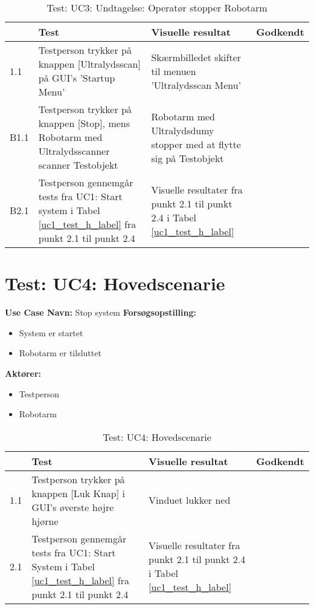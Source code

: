 \begin{table}[htb]
\begin{tabularx}{\textwidth}{|p{0.7cm}|X|X|p{2cm}|}
\hline
\textbf{} & \textbf{Test} & \textbf{Visuelle resultat} &\textbf{Godkendt} \\ \hline
1.1 & Testperson trykker på knappen [Ultralydsscan] på GUI's 'Startup Menu' & Skærmbilledet skifter til menuen 'Ultralydsscan Menu' & \\ \hline
B1.1 & Testperson trykker på knappen [Stop], mens Robotarm med Ultralydsscanner scanner Testobjekt & Robotarm med Ultralydsdumy stopper med at flytte sig på Testobjekt &\\\hline
B2.1 &  Testperson gennemgår tests fra UC1: Start system i Tabel \ref{uc1_test_h_label} fra punkt 2.1 til punkt 2.4  & Visuelle resultater fra punkt 2.1 til punkt 2.4 i Tabel \ref{uc1_test_h_label} & \\ \hline
\end{tabularx}
    \caption{Test: UC3: Undtagelse: Operatør stopper Robotarm} 
    \label{uc3_test_e_2_label}  
\end{table}
\newpage

\section{Test: UC4: Hovedscenarie}
\textbf{Use Case Navn:} Stop system \newline
\textbf{Forsøgsopstilling:}
\begin{itemize}
\item System er startet
\item Robotarm er tilsluttet
\end{itemize}  
\textbf{Aktører:}
\begin{itemize}
\item Testperson
\item Robotarm
\end{itemize}  

\begin{table}[htb]
\begin{tabularx}{\textwidth}{|p{0.5cm}|X|X|p{2cm}|}
\hline
\textbf{} & \textbf{Test} & \textbf{Visuelle resultat} &\textbf{Godkendt} \\ \hline
1.1 & Testperson trykker på knappen [Luk Knap] i GUI's øverste højre hjørne & Vinduet lukker ned & \\ \hline
2.1 & Testperson gennemgår tests fra UC1: Start System i Tabel \ref{uc1_test_h_label} fra punkt 2.1 til punkt 2.4  & Visuelle resultater fra punkt 2.1 til punkt 2.4 i Tabel \ref{uc1_test_h_label} & \\ \hline
\end{tabularx}
    \caption{Test: UC4: Hovedscenarie}
    \label{uc4_test_h_label}  
\end{table}
